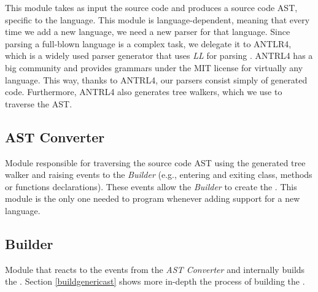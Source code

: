 This module takes as input the source code and produces a source code AST, specific to the language. This module is language-dependent, meaning that every time we add a new language, we need a new parser for that language. Since parsing a full-blown language is a complex task, we delegate it to ANTLR4, which is a widely used parser generator that uses \textit{LL} for parsing \cite{antlr4book}. ANTRL4 has a big community and provides grammars under the MIT license for virtually any language. This way, thanks to ANTRL4, our parsers consist simply of generated code. Furthermore, ANTRL4 also generates tree walkers, which we use to traverse the AST.

\subsection{AST Converter}
Module responsible for traversing the source code AST using the generated tree walker and raising events to the \textit{\astname{} Builder} (e.g., entering and exiting class, methods or functions declarations). These events allow the \textit{\astname{} Builder} to create the \astname{}. This module is the only one needed to program whenever adding support for a new language.

\subsection{\astname{} Builder} 

Module that reacts to the events from the \textit{AST Converter} and internally builds the \astname{}. Section \ref{buildgenericast} shows more in-depth the process of building the \astname{}. 

